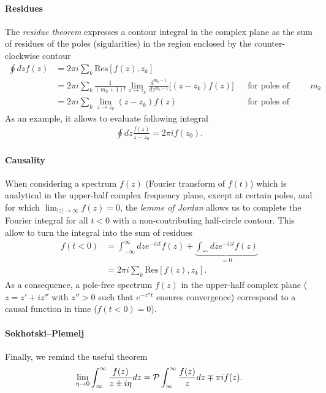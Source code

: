 \documentclass[notitlepage,11pt,nofootinbib]{revtex4-1}
\begin{document}
\paragraph*{Residues} The \emph{residue theorem} expresses a contour integral in the complex plane as the sum of residues of the poles (sigularities) in the region enclosed by the counter-clockwise contour
\begin{align}
\oint dz f(z) 
&= 
2\pi i \sum_{k}\text{Res}[f(z),z_k]
\label{residue}
\\
&=
2\pi i \sum_{k}
\frac{1}{(m_k+1)!}
\lim_{z\rightarrow z_k}
\frac{d^{{m_k-1}}}{dz^{m_k-1}}
\Big[(z-z_k)f(z)\Big]
\label{residue_order_m}
&&\text{for poles of order $m_k$}
\\
&=
2\pi i \sum_{k}
\lim_{z\rightarrow z_k}
(z-z_k)f(z)
\label{residue_order_1}
&&\text{for poles of order 1}
\end{align}
As an example, it allows to evaluate following integral
\begin{align}
\oint dz \frac{f(z)}{z-z_0} = 2\pi i f(z_{0}).
\label{simplest_residue}
\end{align}

\paragraph*{Causality} When considering a spectrum $f(z)$ (Fourier transform of $f(t)$) which is analytical in the upper-half complex frequency plane, except at certain poles, and for which $\lim_{|z|\rightarrow\infty} f(z) = 0$, the \emph{lemme of Jordan} allows us to complete the Fourier integral for all $t<0$ with a non-contributing half-circle contour. This allow to turn the integral into the sum of residues
\begin{align}
f(t<0)
&=
\int_{-\infty}^{\infty} dz e^{-iz t} f(z)
+ \underbrace{
\int_{\curvearrowleft} dz e^{-iz t}f(z)
}_{=0}
\label{causal1}
\\&= 
2\pi i \sum_{k}\text{Res}[f(z),z_k].
\label{causal2}
\end{align}
As a consequence, a pole-free spectrum $f(z)$ in the upper-half complex plane ($z=z'+iz''$ with $z''>0$ such that $e^{-z''t}$ ensures convergence) correspond to a causal function in time ($f(t<0)=0$).

\paragraph*{Sokhotski–Plemelj} Finally, we remind the useful theorem
\begin{align}
\lim_{\eta\rightarrow 0}\int_{\-\infty}^{\infty} \frac{f(z)}{z \pm i\eta} dz
=  
\mathcal P \int_{\-\infty}^{\infty} \frac{f(z)}{z} dz \mp \pi i f(z).
\label{Sokhotski_Plemelj}
\end{align}
\end{document}
